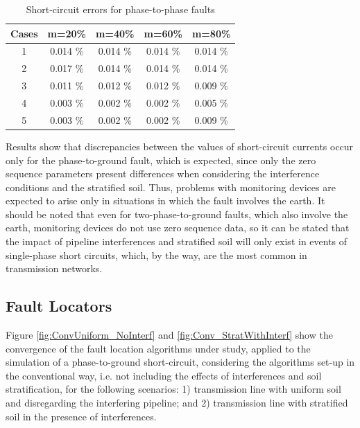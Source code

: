 \documentclass[conference]{IEEEtran}
\begin{document}
\begin{table}[!hbt]
	\renewcommand{\arraystretch}{1.3}
	\caption{Short-circuit errors for phase-to-phase faults}
	\label{table:Ab_CC_E}
	\centering
	\begin{tabular}{|c|c|c|c|c|}
		\hline
		\textbf{Cases} & \textbf{m=20\%} & \textbf{m=40\%} & \textbf{m=60\%} & \textbf{m=80\%} \\ \hline
		1              & 0.014 \%        & 0.014 \%        & 0.014 \%        & 0.014 \%        \\ \hline
		2              & 0.017 \%        & 0.014 \%        & 0.014 \%        & 0.014 \%        \\ \hline
		3              & 0.011 \%        & 0.012 \%        & 0.012 \%        & 0.009 \%        \\ \hline
		4              & 0.003 \%        & 0.002 \%        & 0.002 \%        & 0.005 \%        \\ \hline
		5              & 0.003 \%        & 0.002 \%        & 0.002 \%        & 0.009 \%        \\ \hline
	\end{tabular}
\end{table}

Results show that discrepancies between the values of short-circuit currents occur only for the phase-to-ground fault, which is expected, since only the zero sequence parameters present differences when considering the interference conditions and the stratified soil. Thus, problems with monitoring devices are expected to arise only in situations in which the fault involves the earth. It should be noted that even for two-phase-to-ground faults, which also involve the earth, monitoring devices do not use zero sequence data, so it can be stated that the impact of pipeline interferences and stratified soil will only exist in events of single-phase short circuits, which, by the way, are the most common in transmission networks. 

\subsection{Fault Locators}

Figure \ref{fig:ConvUniform_NoInterf} and \ref{fig:Conv_StratWithInterf} show the convergence of the fault location algorithms under study, applied to the simulation of a phase-to-ground short-circuit, considering the algorithms set-up in the conventional way, i.e. not including the effects of interferences and soil stratification, for the following scenarios: 1) transmission line with uniform soil and disregarding the interfering pipeline; and 2) transmission line with stratified soil in the presence of interferences.
\end{document}
